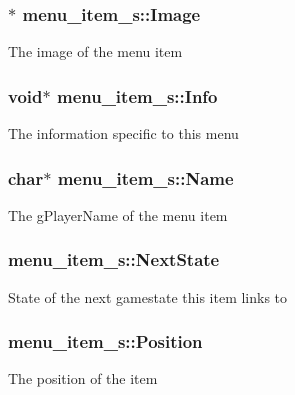 \subsubsection[{\texorpdfstring{Image}{Image}}]{$\ast$ menu\+\_\+item\+\_\+s\+::\+Image}\hypertarget{structmenu__item__s_aacd90028224c5c683113447b0fe8df5d}{}\label{structmenu__item__s_aacd90028224c5c683113447b0fe8df5d}
The image of the menu item 
\subsubsection[{\texorpdfstring{Info}{Info}}]{\setlength{\rightskip}{0pt plus 5cm}void$\ast$ menu\+\_\+item\+\_\+s\+::\+Info}\hypertarget{structmenu__item__s_a347d86d002232139852a36d6ce2ad702}{}\label{structmenu__item__s_a347d86d002232139852a36d6ce2ad702}
The information specific to this menu 
\subsubsection[{\texorpdfstring{Name}{Name}}]{\setlength{\rightskip}{0pt plus 5cm}char$\ast$ menu\+\_\+item\+\_\+s\+::\+Name}\hypertarget{structmenu__item__s_aec315df255579720166ff7b8839480d7}{}\label{structmenu__item__s_aec315df255579720166ff7b8839480d7}
The g\+Player\+Name of the menu item 
\subsubsection[{\texorpdfstring{Next\+State}{NextState}}]{ menu\+\_\+item\+\_\+s\+::\+Next\+State}\hypertarget{structmenu__item__s_a75452e55959415b680bb07ed7b97f4a2}{}\label{structmenu__item__s_a75452e55959415b680bb07ed7b97f4a2}
State of the next gamestate this item links to 
\subsubsection[{\texorpdfstring{Position}{Position}}]{ menu\+\_\+item\+\_\+s\+::\+Position}\hypertarget{structmenu__item__s_a59128f8d229e03ff7a5d70e230c60797}{}\label{structmenu__item__s_a59128f8d229e03ff7a5d70e230c60797}
The position of the item 
